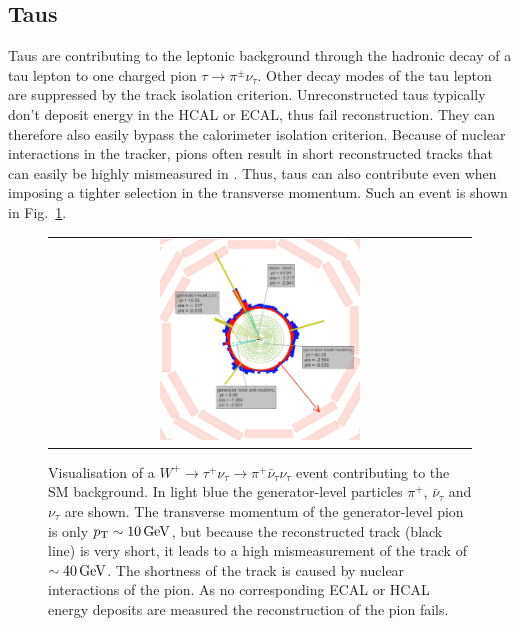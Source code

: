 \subsection*{Taus}
Taus are contributing to the leptonic background through the hadronic decay of a tau lepton to one charged pion $\tau\rightarrow\pi^{\pm}\nu_{\tau}$.
Other decay modes of the tau lepton are suppressed by the track isolation criterion.
Unreconstructed taus typically don't deposit energy in the HCAL or ECAL, thus fail reconstruction.
They can therefore also easily bypass the calorimeter isolation criterion.
Because of nuclear interactions in the tracker, pions often result in short reconstructed tracks that can easily be highly mismeasured in \pt.
Thus, taus can also contribute even when imposing a tighter selection in the transverse momentum.
Such an event is shown in Fig.~\ref{fig:LostTau}.  
\begin{figure}[!tb]
  \centering 
  \begin{tabular}{c}
    \includegraphics[width=0.49\textwidth]{figures/analysis/Background/LostTau_lumi_20940_event_8369426.png}
  \end{tabular}
  \caption{Visualisation of a $W^{+}\rightarrow \tau^{+}\nu_{\tau} \rightarrow \pi^{+}\bar{\nu}_{\tau} \nu_{\tau} $ event contributing to the SM background. 
           In light blue the generator-level particles $\pi^{+}$, $\bar{\nu}_{\tau}$ and $\nu_{\tau}$ are shown.
           The transverse momentum of the generator-level pion is only $p_{\text{T}}\sim10\,\text{Ge}\kern-0.06667em\text{V}$, but because the reconstructed track (black line) is very short, it leads to a high mismeasurement of the track \pt of $\sim40\,\text{Ge}\kern-0.06667em\text{V}$.
           The shortness of the track is caused by nuclear interactions of the pion.
           As no corresponding ECAL or HCAL energy deposits are measured the reconstruction of the pion fails.}
  \label{fig:LostTau}
\end{figure}

